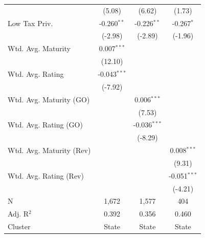 \begin{tabular*}{\textwidth}{@{\extracolsep{\fill}}lccc}
                              & (5.08)                     & (6.62)             & (1.73)\\   
   Low Tax Priv.              & -0.260$^{**}$               & -0.226$^{**}$       & -0.267$^{*}$\\   
                              & (-2.98)                    & (-2.89)            & (-1.96)\\   
   Wtd. Avg. Maturity         & 0.007$^{***}$               &                     &   \\   
                              & (12.10)                    &                     &   \\   
   Wtd. Avg. Rating           & -0.043$^{***}$              &                     &   \\   
                              & (-7.92)                    &                     &   \\   
   Wtd. Avg. Maturity (GO)    &                             & 0.006$^{***}$       &   \\   
                              &                             & (7.53)             &   \\   
   Wtd. Avg. Rating (GO)      &                             & -0.036$^{***}$      &   \\   
                              &                             & (-8.29)            &   \\   
   Wtd. Avg. Maturity (Rev)   &                             &                     & 0.008$^{***}$\\   
                              &                             &                     & (9.31)\\   
   Wtd. Avg. Rating (Rev)     &                             &                     & -0.051$^{***}$\\   
                              &                             &                     & (-4.21)\\   
   \hline
   N               & 1,672                       & 1,577               & 404\\  
   Adj. R$^2$             & 0.392                       & 0.356               & 0.460\\  
   Cluster              & State & State & State\\  
   \bottomrule
\end{tabular*}
\par\endgroup
